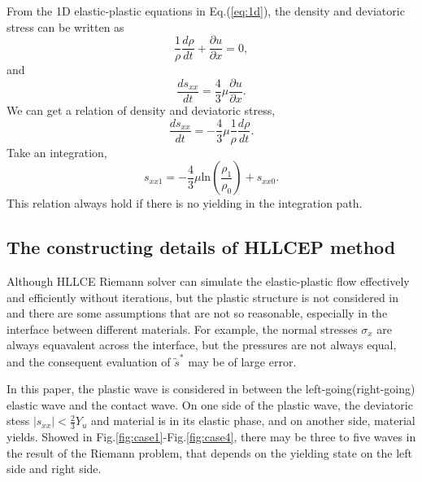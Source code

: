 \documentclass{article}
\numberwithin{equation}{section}
\numberwithin{table}{section}
\begin{document}
  From the 1D elastic-plastic  equations in Eq.(\ref{eq:1d}), the density and deviatoric stress can be written as 
  \begin{equation}
	\frac{1}{\rho}\frac{d\rho}{dt}+\frac{\partial u}{\partial x} =0,
  \end{equation}
  and
  \begin{equation}
	\frac{ds_{xx}}{dt}=\frac{4}{3}\mu\frac{\partial u}{\partial x}.
  \end{equation}
  We can get a relation of density and deviatoric stress,
  \begin{equation}
	\frac{ds_{xx}}{dt}=-\frac{4}{3}\mu \frac{1}{\rho}\frac{d\rho}{dt}.
\end{equation}
Take an integration, 
\begin{equation}\label{eq:rhosxx}
  s_{xx1}=-\frac{4}{3}\mu\text{ln}(\frac{\rho_{1}}{\rho_{0}})+s_{xx0}.
\end{equation}
This relation always hold if there is no yielding in the integration path. 
\subsection{The constructing details of HLLCEP method}
Although HLLCE Riemann solver can simulate the elastic-plastic flow effectively and efficiently without iterations, but the plastic structure is not considered in and  there are some assumptions that are not so reasonable, especially in the interface between different materials. For example, the normal stresses $\sigma_x$ are  always equavalent across the interface, but the pressures are not always equal, and the consequent evaluation of $\widetilde{s}^*$ may   be of large error. 

In this paper, the plastic wave is considered in between the left-going(right-going) elastic wave and the contact wave. On one side of the plastic wave, the deviatoric stess $|s_{xx}|<\frac{2}{3}Y_u$ and material is in its elastic phase, and on another side, material yields.   Showed in Fig.\ref{fig:case1}-Fig.\ref{fig:case4},  there may be three  to five waves in the result of the Riemann problem, that  depends on the  yielding state  on the left side and right side.  
\end{document}
